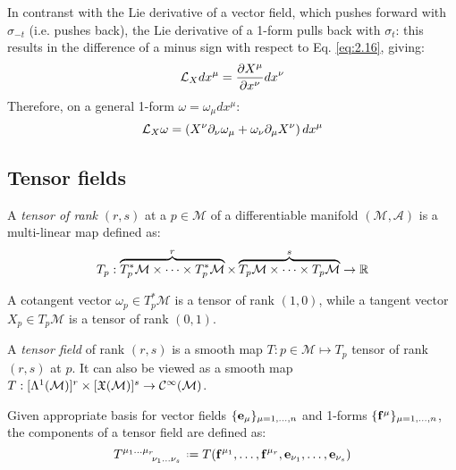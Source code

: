 In contranst with the Lie derivative of a vector field, which pushes forward with $ \sigma_{-t} $ (i.e. pushes back), the Lie derivative of a 1-form pulls back with $ \sigma_t $: this results in the difference of a minus sign with respect to Eq. \ref{eq:2.16}, giving:
\begin{equation}
  \mathcal{L}_X dx^{\mu} = \frac{\partial X^{\mu}}{\partial x^{\nu}} dx^{\nu}
  \label{eq:2.22}
\end{equation}
Therefore, on a general 1-form $ \omega = \omega_{\mu} dx^{\mu} $:
\begin{equation}
  \mathcal{L}_X \omega = \left( X^{\nu} \partial_{\nu} \omega_{\mu} + \omega_{\nu} \partial_{\mu} X^{\nu} \right) dx^{\mu}
  \label{eq:2.23}
\end{equation}

\subsection{Tensor fields}

\begin{definition}
  A \textit{tensor of rank} $ (r,s) $ at a $ p\in\mathcal{M} $ of a differentiable manifold $ (\mathcal{M},\mathcal{A}) $ is a multi-linear map defined as:
  \begin{equation}
    T_p : \overbrace{T^*_p \mathcal{M} \times \dots \times T^*_p \mathcal{M}}^{r} \times \overbrace{T_p \mathcal{M} \times \dots \times T_p \mathcal{M}}^{s} \rightarrow \mathbb{R}
    \label{eq:2.24}
  \end{equation}
\end{definition}

\begin{example}
  A cotangent vector $ \omega_p \in T^*_p \mathcal{M} $ is a tensor of rank $ (1,0) $, while a tangent vector $ X_p \in T_p \mathcal{M} $ is a tensor of rank $ (0,1) $.
\end{example}

\begin{definition}
  A \textit{tensor field} of rank $ (r,s) $ is a smooth map $ T : p \in \mathcal{M} \mapsto T_p $ tensor of rank $ (r,s) $ at $ p $. It can also be viewed as a smooth map $ T : [\Lambda^{1}(\mathcal{M})]^r \times [\mathfrak{X}(\mathcal{M})]^s \rightarrow \mathcal{C}^{\infty}(\mathcal{M}) $.
\end{definition}

Given appropriate basis for vector fields $ \{\mathbf{e}_{\mu}\}_{\mu = 1,\dots,n} $ and 1-forms $ \{\mathbf{f}^{\mu}\}_{\mu = 1,\dots,n} $, the components of a tensor field are defined as:
\begin{equation}
  \tensor{T}{^{\mu_1}^{\dots}^{\mu_r}_{\nu_1}_{\dots}_{\nu_s}} \defeq T(\ve{f}^{\mu_1},\dots,\ve{f}^{\mu_r},\ve{e}_{\nu_1},\dots,\ve{e}_{\nu_s})
  \label{eq:2.25}
\end{equation}

